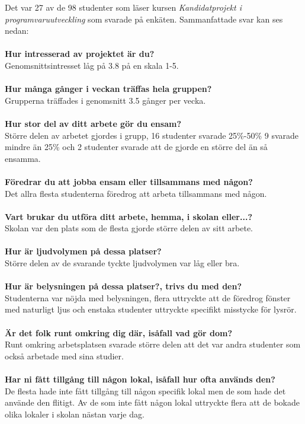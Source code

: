 Det var 27 av de 98 studenter som läser kursen \textit{Kandidatprojekt i programvaruutveckling} som svarade på enkäten. Sammanfattade svar kan ses nedan:\\
\\\textbf{Hur intresserad av projektet är du?}\\ 
Genomsnittsintresset låg på 3.8 på en skala 1-5.\\\\
\textbf{Hur många gånger i veckan träffas hela gruppen?}\\
Grupperna träffades i genomsnitt 3.5 gånger per vecka.\\\\
\textbf{Hur stor del av ditt arbete gör du ensam?}\\
Större delen av arbetet gjordes i grupp, 16 studenter svarade 25\%-50\% 9 svarade  mindre än 25\% och 2 studenter svarade att de gjorde en större del än så ensamma.\\\\
\textbf{Föredrar du att jobba ensam eller tillsammans med någon?}\\
Det allra flesta studenterna föredrog att arbeta tillsammans med någon.\\\\
\textbf{Vart brukar du utföra ditt arbete, hemma, i skolan eller...?}\\
Skolan var den plats som de flesta gjorde större delen av sitt arbete. \\\\
\textbf{Hur är ljudvolymen på dessa platser?}\\
Större delen av de svarande tyckte ljudvolymen var låg eller bra.\\\\
\textbf{Hur är belysningen på dessa platser?, trivs du med den?}\\
Studenterna var nöjda med belysningen, flera uttryckte att de föredrog fönster med naturligt ljus och enstaka studenter uttryckte specifikt misstycke för lysrör.\\\\
\textbf{Är det folk runt omkring dig där, isåfall vad gör dom?}\\
Runt omkring arbetsplatsen svarade större delen att det var andra studenter som också arbetade med sina studier.\\\\
\textbf{Har ni fått tillgång till någon lokal, isåfall hur ofta används den?}\\
De flesta hade inte fått tillgång till någon specifik lokal men de som hade det använde den flitigt. Av de som inte fått någon lokal uttryckte flera att de bokade olika lokaler i skolan nästan varje dag.\\\\
